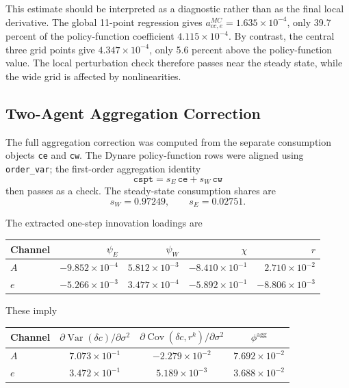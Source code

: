 \documentclass[11pt]{article}
\newcommand{\Var}{\operatorname{Var}}
\newcommand{\Cov}{\operatorname{Cov}}
\theoremstyle{plain}
\theoremstyle{definition}
\begin{document}
This estimate should be interpreted as a diagnostic rather than as the final
local derivative. The global 11-point regression gives
$a_{cc,e}^{MC}=1.635\times10^{-4}$, only 39.7 percent of the policy-function
coefficient $4.115\times10^{-4}$. By contrast, the central three grid points
give $4.347\times10^{-4}$, only 5.6 percent above the policy-function value.
The local perturbation check therefore passes near the steady state, while the
wide grid is affected by nonlinearities.

\subsection{Two-Agent Aggregation Correction}

The full aggregation correction was computed from the separate consumption
objects \texttt{ce} and \texttt{cw}. The Dynare policy-function rows were
aligned using \texttt{order\_var}; the first-order aggregation identity
\[
\texttt{cspt}=s_E\,\texttt{ce}+s_W\,\texttt{cw}
\]
then passes as a check. The steady-state consumption shares are
\[
s_W=0.97249,\qquad s_E=0.02751.
\]

The extracted one-step innovation loadings are
\begin{center}
\begin{tabular}{lrrrr}
\toprule
Channel & $\psi_E$ & $\psi_W$ & $\chi$ & $r$ \\
\midrule
$A$ & $-9.852\times10^{-4}$ & $5.812\times10^{-3}$ &
$-8.410\times10^{-1}$ & $2.710\times10^{-2}$ \\
$e$ & $-5.266\times10^{-3}$ & $3.477\times10^{-4}$ &
$-5.892\times10^{-1}$ & $-8.806\times10^{-3}$ \\
\bottomrule
\end{tabular}
\end{center}
These imply
\begin{center}
\begin{tabular}{lccc}
\toprule
Channel & $\partial\Var(\delta c)/\partial\sigma^2$ &
$\partial\Cov(\delta c,r^k)/\partial\sigma^2$ &
$\phi^{\mathrm{agg}}$ \\
\midrule
$A$ & $7.073\times10^{-1}$ & $-2.279\times10^{-2}$ &
$7.692\times10^{-2}$ \\
$e$ & $3.472\times10^{-1}$ & $5.189\times10^{-3}$ &
$3.688\times10^{-2}$ \\
\bottomrule
\end{tabular}
\end{center}
\end{document}
